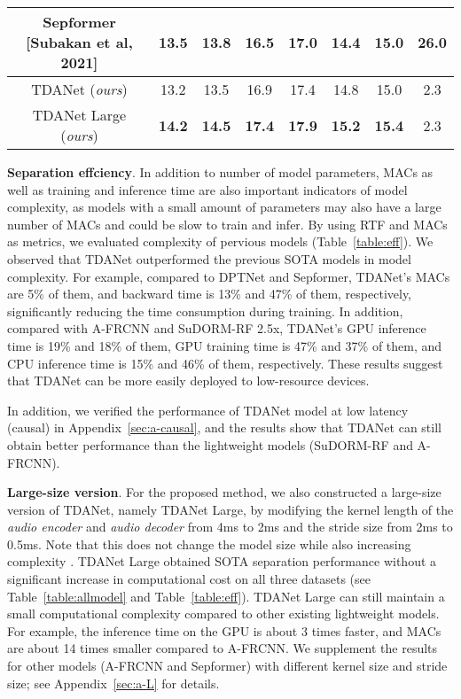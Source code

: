 \documentclass{article} \usepackage{iclr2023_conference,times}
\begin{document}
\begin{table}[ht]
\begin{tabular}{cccccccc}
Sepformer   [Subakan et al, 2021]          & 13.5           & 13.8        & 16.5            & 17.0        & 14.4          & 15.0     & 26.0                                 \\
\midrule
TDANet (\textit{ours})        & 13.2           & 13.5         & 16.9            & 17.4        & 14.8          & 15.0      & 2.3                                  \\
TDANet Large (\textit{ours})       & \bf 14.2           & \bf 14.5         & \bf 17.4            & \bf 17.9        & \bf 15.2          & \bf 15.4      & 2.3     \\         
\bottomrule
\end{tabular}
\vspace{-1.5em}
\end{table}

\textbf{Separation effciency}. In addition to number of model parameters, MACs as well as training and inference time are also important indicators of model complexity, as models with a small amount of parameters may also have a large number of MACs and could be slow to train and infer. By using RTF and MACs as metrics, we evaluated complexity of pervious models (Table~\ref{table:eff}). We observed that TDANet outperformed the previous SOTA models in model complexity. For example, compared to DPTNet and Sepformer, TDANet's MACs are 5\% of them, and backward time is 13\% and 47\% of them, respectively, significantly reducing the time consumption during training. In addition, compared with A-FRCNN and SuDORM-RF 2.5x, TDANet's GPU inference time is 19\% and 18\% of them, GPU training time is 47\% and 37\% of them, and CPU inference time is 15\% and 46\% of them, respectively. These results suggest that TDANet can be more easily deployed to low-resource devices. 

In addition, we verified the performance of TDANet model at low latency (causal) in Appendix~\ref{sec:a-causal}, and the results show that TDANet can still obtain better performance than the lightweight models (SuDORM-RF and A-FRCNN).


\textbf{Large-size version}. For the proposed method, we also constructed a large-size version of TDANet, namely TDANet Large, by modifying the kernel length of the \textit{audio encoder} and \textit{audio decoder} from 4ms to 2ms and the stride size from 2ms to 0.5ms. Note that this does not change the model size while also increasing complexity \citep{tzinis2020sudo,luo2020dual,bahmaninezhad2019unified}. TDANet Large obtained SOTA separation performance without a significant increase in computational cost on all three datasets (see Table~\ref{table:allmodel} and Table~\ref{table:eff}). 
TDANet Large can still maintain a small computational complexity compared to other existing lightweight models. For example, the inference time on the GPU is about 3 times faster, and MACs are about 14 times smaller compared to A-FRCNN. We supplement the results for other models (A-FRCNN and Sepformer) with different kernel size and stride size; see Appendix~\ref{sec:a-L} for details.
\end{document}
